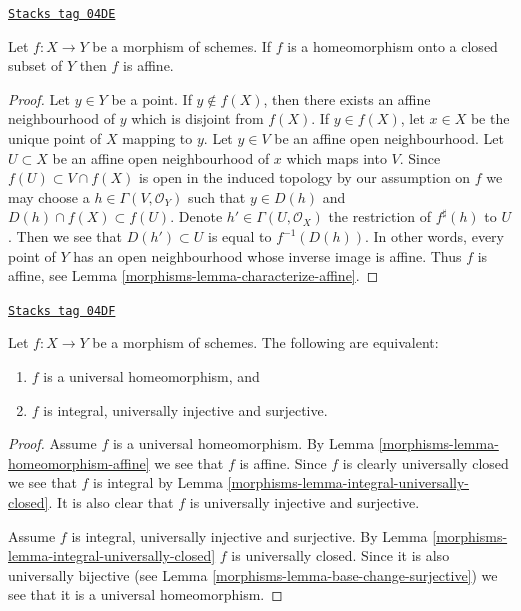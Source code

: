 \begin{lemma}
\label{morphisms-lemma-homeomorphism-affine}
\href{https://stacks.math.columbia.edu/tag/04DE}{\texttt{Stacks tag 04DE}}

Let $f : X \to Y$ be a morphism of schemes. If $f$ is a homeomorphism
onto a closed subset of $Y$ then $f$ is affine.
\end{lemma}

\begin{proof}

Let $y \in Y$ be a point. If $y \not \in f(X)$, then there exists
an affine neighbourhood of $y$ which is disjoint from $f(X)$.
If $y \in f(X)$, let $x \in X$ be the unique point of $X$ mapping to $y$.
Let $y \in V$ be an affine open neighbourhood.
Let $U \subset X$ be an affine open neighbourhood of $x$ which maps into $V$.
Since $f(U) \subset V \cap f(X)$ is open in the induced topology by our
assumption on $f$ we may choose a
$h \in \Gamma(V, \mathcal{O}_Y)$ such that $y \in D(h)$
and $D(h) \cap f(X) \subset f(U)$. Denote $h' \in \Gamma(U, \mathcal{O}_X)$
the restriction of $f^\sharp(h)$ to $U$. Then we see that
$D(h') \subset U$ is equal to $f^{-1}(D(h))$. In other words, every point
of $Y$ has an open neighbourhood whose inverse image is affine.
Thus $f$ is affine, see
Lemma \ref{morphisms-lemma-characterize-affine}.
\end{proof}

\begin{lemma}
\label{morphisms-lemma-universal-homeomorphism}
\href{https://stacks.math.columbia.edu/tag/04DF}{\texttt{Stacks tag 04DF}}

Let $f : X \to Y$ be a morphism of schemes. The following are
equivalent:
\begin{enumerate}
\item $f$ is a universal homeomorphism, and
\item $f$ is integral, universally injective and surjective.
\end{enumerate}
\end{lemma}

\begin{proof}

Assume $f$ is a universal homeomorphism. By
Lemma \ref{morphisms-lemma-homeomorphism-affine}
we see that $f$ is affine. Since $f$ is clearly universally closed we
see that $f$ is integral by
Lemma \ref{morphisms-lemma-integral-universally-closed}.
It is also clear that $f$ is universally injective and surjective.

\medskip\noindent
Assume $f$ is integral, universally injective and surjective. By
Lemma \ref{morphisms-lemma-integral-universally-closed}
$f$ is universally closed. Since it is also universally bijective (see
Lemma \ref{morphisms-lemma-base-change-surjective})
we see that it is a universal homeomorphism.
\end{proof}

